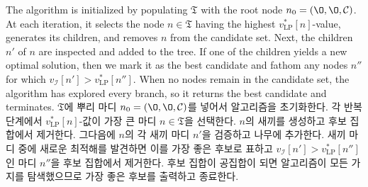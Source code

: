 \documentclass[11pt]{article} %
\theoremstyle{definition}
\theoremstyle{definition}
\begin{document}
\ifen
The algorithm is initialized by populating $\mathfrak{T}$ with the root node $n_0 = (\O, \O, \mathcal{C})$. At each iteration, it selects the node $n \in \mathfrak{T}$ having the highest $v_{\mathrm{LP}}^*[n]$-value, generates its children, and removes $n$ from the candidate set. Next, the children $n'$ of $n$ are inspected and added to the tree. If one of the children yields a new optimal solution, then we mark it as the best candidate and fathom any nodes $n''$ for which  $v_{\mathcal{I}}[n'] >  v_{\mathrm{LP}}^*[n'']$. When no nodes remain in the candidate set, the algorithm has explored every branch, so it returns the best candidate and terminates.
\else
$\mathfrak{T}$에 뿌리 마디 $n_0 = (\O, \O, \mathcal{C})$를 넣어서 알고리즘을 초기화한다. 각 반복 단계에서 $v_{\mathrm{LP}}^*[n]$-값이 가장 큰 마디 $n \in \mathfrak{T}$을 선택한다. $n$의 새끼를 생성하고 후보 집합에서 제거한다. 그다음에 $n$의 각 새끼 마디 $n'$을 검증하고 나무에 추가한다. 새끼 마디 중에 새로운 최적해를 발견하면 이를 가장 좋은 후보로 표하고  $v_{\mathcal{I}}[n'] >  v_{\mathrm{LP}}^*[n'']$인 마디 $n''$을 후보 집합에서 제거한다. 후보 집합이 공집합이 되면 알고리즘이 모든 가지를 탐색했으므로 가장 좋은 후보를 출력하고 종료한다.
\fi
\end{document}
